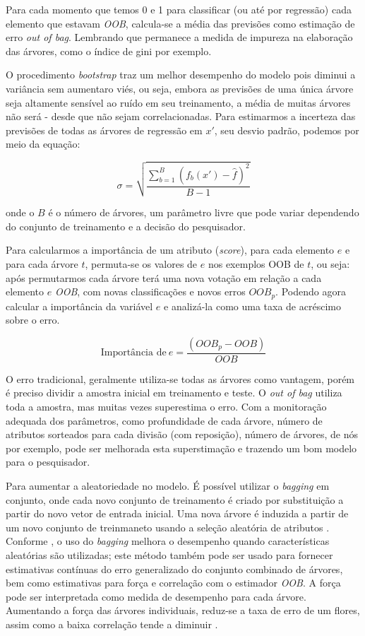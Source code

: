 \documentclass[
]{book}
\begin{document}
Para cada momento que temos 0 e 1 para classificar (ou até por regressão) cada elemento que estavam \emph{OOB}, calcula-se a média das previsões como estimação de erro \emph{out of bag}. Lembrando que permanece a medida de impureza na elaboração das árvores, como o índice de gini por exemplo.

O procedimento \emph{bootstrap} traz um melhor desempenho do modelo pois diminui a variância sem aumentaro viés, ou seja, embora as previsões de uma única árvore seja altamente sensível ao ruído em seu treinamento, a média de muitas árvores não será - desde que não sejam correlacionadas. Para estimarmos a incerteza das previsões de todas as árvores de regressão em \(x'\), seu desvio padrão, podemos por meio da equação:

\begin{equation}
\sigma = \sqrt{\frac{\sum^B_{b=1}(f_b(x')-\hat{f})^2}{B-1}}
\label{eq:desviorf}
\end{equation}

onde o \(B\) é o número de árvores, um parâmetro livre que pode variar dependendo do conjunto de treinamento e a decisão do pesquisador.

Para calcularmos a importância de um atributo (\emph{score}), para cada elemento \(e\) e para cada árvore \(t\), permuta-se os valores de \(e\) nos exemplos OOB de \(t\), ou seja: após permutarmos cada árvore terá uma nova votação em relação a cada elemento \(e\) \emph{OOB}, com novas classificações e novos erros \(OOB_p\). Podendo agora calcular a importância da variável \(e\) e analizá-la como uma taxa de acréscimo sobre o erro.

\begin{equation}
\mbox{Importância de} \ e = \frac{(OOB_p-OOB)}{OOB}
\label{eq:impc}
\end{equation}

O erro tradicional, geralmente utiliza-se todas as árvores como vantagem, porém é preciso dividir a amostra inicial em treinamento e teste. O \emph{out of bag} utiliza toda a amostra, mas muitas vezes superestima o erro. Com a monitoração adequada dos parâmetros, como profundidade de cada árvore, número de atributos sorteados para cada divisão (com reposição), número de árvores, de nós por exemplo, pode ser melhorada esta superstimação e trazendo um bom modelo para o pesquisador.

Para aumentar a aleatoriedade no modelo. É possível utilizar o \emph{bagging} em conjunto, onde cada novo conjunto de treinamento é criado por substituição a partir do novo vetor de entrada inicial. Uma nova árvore é induzida a partir de um novo conjunto de treinmaneto usando a seleção aleatória de atributos \citep{gomez2012random}. Conforme \citep{breiman2001random}, o uso do \emph{bagging} melhora o desempenho quando características aleatórias são utilizadas; este método também pode ser usado para fornecer estimativas contínuas do erro generalizado do conjunto combinado de árvores, bem como estimativas para força e correlação com o estimador \emph{OOB}. A força pode ser interpretada como medida de desempenho para cada árvore. Aumentando a força das árvores individuais, reduz-se a taxa de erro de um flores, assim como a baixa correlação tende a diminuir \citep{oshiro2013abordagem}.
\end{document}
